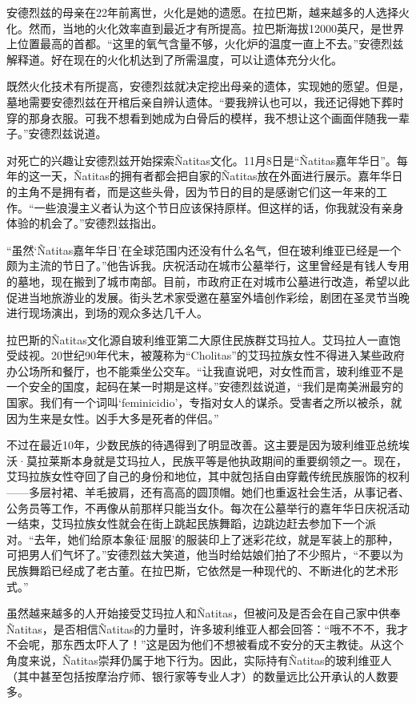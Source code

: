 \documentclass[12pt,oneside]{book}
\begin{document}
安德烈兹的母亲在22年前离世，火化是她的遗愿。在拉巴斯，越来越多的人选择火化。然而，当地的火化效率直到最近才有所提高。拉巴斯海拔12000英尺，是世界上位置最高的首都。“这里的氧气含量不够，火化炉的温度一直上不去。”安德烈兹解释道。好在现在的火化机达到了所需温度，可以让遗体充分火化。

既然火化技术有所提高，安德烈兹就决定挖出母亲的遗体，实现她的愿望。但是，墓地需要安德烈兹在开棺后亲自辨认遗体。“要我辨认也可以，我还记得她下葬时穿的那身衣服。可我不想看到她成为白骨后的模样，我不想让这个画面伴随我一辈子。”安德烈兹说道。

对死亡的兴趣让安德烈兹开始探索Ñatitas文化。11月8日是“Ñatitas嘉年华日”。每年的这一天，Ñatitas的拥有者都会把自家的Ñatitas放在外面进行展示。嘉年华日的主角不是拥有者，而是这些头骨，因为节日的目的是感谢它们这一年来的工作。“一些浪漫主义者认为这个节日应该保持原样。但这样的话，你我就没有亲身体验的机会了。”安德烈兹指出。

“虽然‘Ñatitas嘉年华日’在全球范围内还没有什么名气，但在玻利维亚已经是一个颇为主流的节日了。”他告诉我。庆祝活动在城市公墓举行，这里曾经是有钱人专用的墓地，现在搬到了城市南部。目前，市政府正在对城市公墓进行改造，希望以此促进当地旅游业的发展。街头艺术家受邀在墓室外墙创作彩绘，剧团在圣灵节当晚进行现场演出，到场的观众多达几千人。

拉巴斯的Ñatitas文化源自玻利维亚第二大原住民族群艾玛拉人。艾玛拉人一直饱受歧视。20世纪90年代末，被蔑称为“Cholitas”的艾玛拉族女性不得进入某些政府办公场所和餐厅，也不能乘坐公交车。“让我直说吧，对女性而言，玻利维亚不是一个安全的国度，起码在某一时期是这样。”安德烈兹说道，“我们是南美洲最穷的国家。我们有一个词叫‘feminicidio’，专指对女人的谋杀。受害者之所以被杀，就因为生来是女性。凶手大多是死者的伴侣。”

不过在最近10年，少数民族的待遇得到了明显改善。这主要是因为玻利维亚总统埃沃·莫拉莱斯本身就是艾玛拉人，民族平等是他执政期间的重要纲领之一。现在，艾玛拉族女性夺回了自己的身份和地位，其中就包括自由穿戴传统民族服饰的权利——多层衬裙、羊毛披肩，还有高高的圆顶帽。她们也重返社会生活，从事记者、公务员等工作，不再像从前那样只能当女仆。每次在公墓举行的嘉年华日庆祝活动一结束，艾玛拉族女性就会在街上跳起民族舞蹈，边跳边赶去参加下一个派对。“去年，她们给原本象征‘屈服’的服装印上了迷彩花纹，就是军装上的那种，可把男人们气坏了。”安德烈兹大笑道，他当时给姑娘们拍了不少照片，“不要以为民族舞蹈已经成了老古董。在拉巴斯，它依然是一种现代的、不断进化的艺术形式。”

虽然越来越多的人开始接受艾玛拉人和Ñatitas，但被问及是否会在自己家中供奉Ñatitas，是否相信Ñatitas的力量时，许多玻利维亚人都会回答：“哦不不不，我才不会呢，那东西太吓人了！”这是因为他们不想被看成不安分的天主教徒。从这个角度来说，Ñatitas崇拜仍属于地下行为。因此，实际持有Ñatitas的玻利维亚人（其中甚至包括按摩治疗师、银行家等专业人才）的数量远比公开承认的人数要多。
\end{document}
